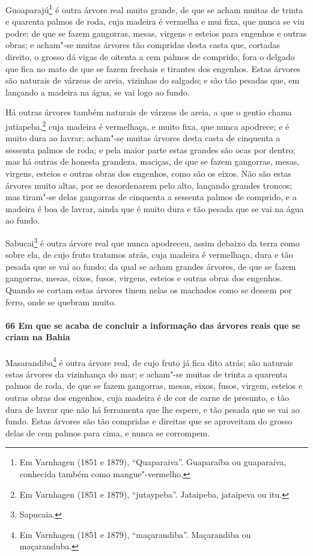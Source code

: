 Guoaparajú\footnote{ Em Varnhagen (1851 e 1879), ``Quaparaiva''. Guaparaíba ou guaparaíva,
conhecida também como mangue"-vermelho.} é outra árvore real muito grande, de que se acham
muitas de trinta e quarenta palmos de roda, cuja madeira é vermelha e mui fixa, que nunca
se viu podre; de que se fazem gangorras, mesas, virgens e esteios para engenhos e outras
obras; e acham"-se muitas árvores tão compridas desta casta que, cortadas direito, o grosso
dá vigas de oitenta a cem palmos de comprido, fora o delgado que fica no mato de que se
fazem frechais e tirantes dos engenhos. Estas árvores são naturais de várzeas de areia,
vizinhas do salgado; e são tão pesadas que, em lançando a madeira na água, se vai logo ao
fundo.

Há outras árvores também naturais de várzeas de areia, a que o gentio chama
jutiapeba,\footnote{ Em Varnhagen (1851 e 1879), ``jutaypeba''. Jataipeba, jataipeva ou
itu.} cuja madeira é vermelhaça, e muito fixa, que nunca apodrece; e é muito dura ao
lavrar; acham"-se muitas árvores desta casta de cinquenta a sessenta palmos de roda; e pela
maior parte estas grandes são ocas por dentro; mas há outras de honesta grandeza, maciças,
de que se fazem gangorras, mesas, virgens, esteios e outras obras dos engenhos, como são
os eixos. Não são estas árvores muito altas, por se desordenarem pelo alto, lançando
grandes troncos; mas tiram"-se delas gangorras de cinquenta a sessenta palmos de comprido,
e a madeira é boa de lavrar, ainda que é muito dura e tão pesada que se vai na água ao
fundo.

Sabucai\footnote{ Sapucaia.} é outra árvore real que nunca apodreceu, assim debaixo da
terra como sobre ela, de cujo fruto tratamos atrás, cuja madeira é vermelhaça, dura e tão
pesada que se vai ao fundo; da qual se acham grandes árvores, de que se fazem gangorras,
mesas, eixos, fusos, virgens, esteios e outras obras dos engenhos. Quando se cortam estas
árvores tinem nelas os machados como se dessem por ferro, onde se quebram muito.

\paragraph{66 Em que se acaba de concluir a informação das árvores reais que se criam na
Bahia}

Masarandiba\footnote{ Em Varnhagen (1851 e 1879), ``maçarandiba''. Maçarandiba ou
maçaranduba.} é outra árvore real, de cujo fruto já fica dito atrás; são naturais estas
árvores da vizinhança do mar; e acham"-se muitas de trinta a quarenta palmos de roda, de
que se fazem gangorras, mesas, eixos, fusos, virgem, esteios e outras obras dos engenhos,
cuja madeira é de cor de carne de presunto, e tão dura de lavrar que não há ferramenta que
lhe espere, e tão pesada que se vai ao fundo. Estas árvores são tão compridas e direitas
que se aproveitam do grosso delas de cem palmos para cima, e nunca se corrompem.

